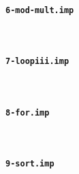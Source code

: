 \documentclass[12pt,a4paper]{article}
\begin{document}


\paragraph{\tt 6-mod-mult.imp} \



\paragraph{\tt 7-loopiii.imp} \



\paragraph{\tt 8-for.imp} \



\paragraph{\tt 9-sort.imp} \


\end{document}
